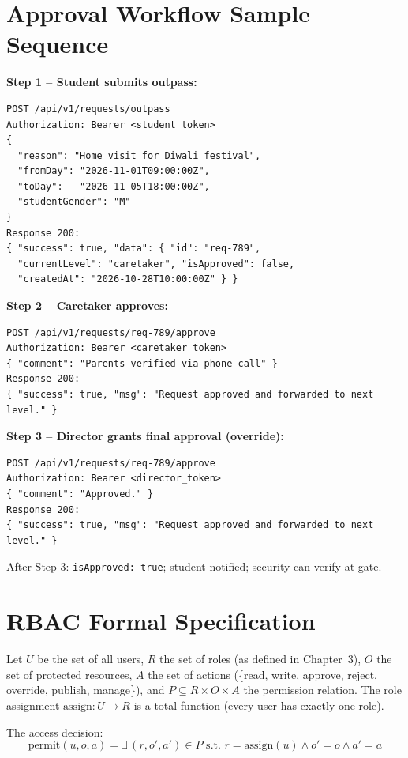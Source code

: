 \documentclass[12pt,a4paper]{report}
\newcommand{\code}[1]{\texttt{#1}}
\begin{document}
\chapter{Approval Workflow Sample Sequence}

\textbf{Step 1 -- Student submits outpass:}
\begin{lstlisting}[caption={Outpass submission and initial response},label={lst:app1}]
POST /api/v1/requests/outpass
Authorization: Bearer <student_token>
{
  "reason": "Home visit for Diwali festival",
  "fromDay": "2026-11-01T09:00:00Z",
  "toDay":   "2026-11-05T18:00:00Z",
  "studentGender": "M"
}
Response 200:
{ "success": true, "data": { "id": "req-789",
  "currentLevel": "caretaker", "isApproved": false,
  "createdAt": "2026-10-28T10:00:00Z" } }
\end{lstlisting}

\textbf{Step 2 -- Caretaker approves:}
\begin{lstlisting}[caption={Caretaker approval},label={lst:app2}]
POST /api/v1/requests/req-789/approve
Authorization: Bearer <caretaker_token>
{ "comment": "Parents verified via phone call" }
Response 200:
{ "success": true, "msg": "Request approved and forwarded to next level." }
\end{lstlisting}

\textbf{Step 3 -- Director grants final approval (override):}
\begin{lstlisting}[caption={Director final approval},label={lst:app3}]
POST /api/v1/requests/req-789/approve
Authorization: Bearer <director_token>
{ "comment": "Approved." }
Response 200:
{ "success": true, "msg": "Request approved and forwarded to next level." }
\end{lstlisting}
After Step 3: \code{isApproved: true}; student notified; security can verify at gate.

\chapter{RBAC Formal Specification}

Let $U$ be the set of all users, $R$ the set of roles (as defined in Chapter~3), $O$ the set of protected resources, $A$ the set of actions (\{read, write, approve, reject, override, publish, manage\}), and $P \subseteq R \times O \times A$ the permission relation. The role assignment $\text{assign}: U \to R$ is a total function (every user has exactly one role).

\vspace{0.3cm}
The access decision:
\begin{equation}
  \text{permit}(u, o, a) = \exists\, (r, o', a') \in P \text{ s.t. } r = \text{assign}(u) \land o' = o \land a' = a
\end{equation}
\end{document}
